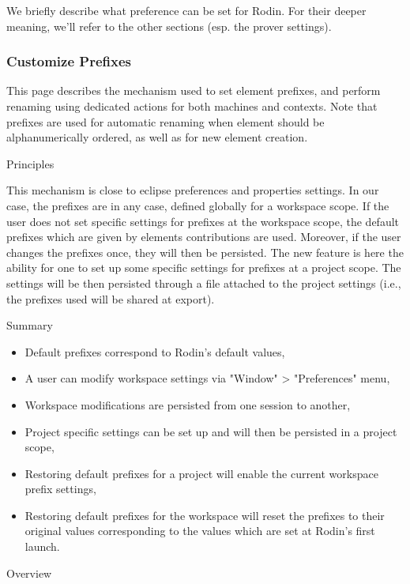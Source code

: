 We briefly describe what preference can be set for Rodin. For their deeper meaning, we'll refer to the other sections (esp. the prover settings).

\subsubsection{Customize Prefixes}


This page describes the mechanism used to set element prefixes, and perform renaming using dedicated actions for both machines and contexts. Note that prefixes are used for automatic renaming when element should be alphanumerically ordered, as well as for new element creation. 

Principles

This mechanism is close to eclipse preferences and properties settings. In our case, the prefixes are in any case, defined globally for a workspace scope. If the user does not set specific settings for prefixes at the workspace scope, the default prefixes which are given by elements contributions are used. Moreover, if the user changes the prefixes once, they will then be persisted. The new feature is here the ability for one to set up some specific settings for prefixes at a project scope. The settings will be then persisted through a file attached to the project settings (i.e., the prefixes used will be shared at export).

Summary

\begin{itemize}
	\item Default prefixes correspond to Rodin's default values,
	\item A user can modify workspace settings via "Window" > "Preferences" menu,
	\item Workspace modifications are persisted from one session to another,
	\item Project specific settings can be set up and will then be persisted in a project scope,
	\item Restoring default prefixes for a project will enable the current workspace prefix settings,
	\item Restoring default prefixes for the workspace will reset the prefixes to their original values corresponding to the values which are set at Rodin's first launch. 
\end{itemize}

Overview 

